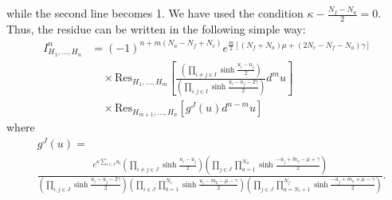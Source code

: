 \documentclass[a4paper,11pt]{article}
\begin{document}
while the second line becomes 1. We have used the condition $\kappa-\frac{N_f-N_a}{2} = 0$. Thus, the residue can be written in the following simple way:
\begin{align}
%
I^n_{H_1,\ldots,H_n} &= (-1)^{n+m (N_a-N_f+N_c)} e^{\frac{m}{2} [(N_f+N_a) \mu+(2 N_c-N_f-N_a) \gamma]} \nonumber \\
%
&\quad \times \mathrm{Res}_{H_1,\ldots,H_m} \left[\frac{\left(\prod_{i \neq j \in I} \sinh \frac{u_i-u_j}{2}\right)}{\left(\prod_{i,j \in I} \sinh \frac{u_i-u_j-2 \gamma}{2}\right)} d^m u\right] \nonumber \\
%
&\quad \times \mathrm{Res}_{H_{m+1},\ldots,H_n} \left[g^J (u) d^{n-m} u\right]
%
\end{align}
where
\begin{align}
& g^J (u) = \nonumber \\
& \frac{e^{\kappa \sum_{i \in J} u_i} \left(\prod_{i \neq j \in J} \sinh \frac{u_i-u_j}{2}\right) \left(\prod_{j \in J} \prod_{a = 1}^{N_a} \sinh \frac{-u_j+\tilde m_a-\mu+\gamma}{2}\right)}{\left(\prod_{i,j \in J} \sinh \frac{u_i-u_j-2 \gamma}{2}\right) \left(\prod_{i \in J} \prod_{b = 1}^{N_c} \sinh \frac{u_i-m_b-\mu-\gamma}{2}\right) \left(\prod_{j \in J} \prod_{a = N_c+1}^{N_f} \sinh \frac{-u_j+m_a+\mu-\gamma}{2}\right)}.
\end{align}
\end{document}

